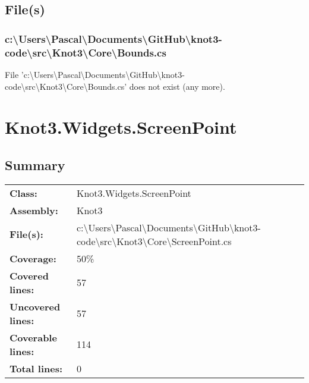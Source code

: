 \documentclass[a4paper,10pt]{article}
\begin{document}
\subsection{File(s)}
\subsubsection{c:\textbackslash Users\textbackslash Pascal\textbackslash Documents\textbackslash GitHub\textbackslash knot3-code\textbackslash src\textbackslash Knot3\textbackslash Core\textbackslash Bounds.cs}
 File 'c:\textbackslash Users\textbackslash Pascal\textbackslash Documents\textbackslash GitHub\textbackslash knot3-code\textbackslash src\textbackslash Knot3\textbackslash Core\textbackslash Bounds.cs' does not exist (any more).
\newpage
\section{Knot3.Widgets.ScreenPoint}
\subsection{Summary}
\begin{longtable}[l]{ll}
\textbf{Class:} & Knot3.Widgets.ScreenPoint\\
\textbf{Assembly:} & Knot3\\
\textbf{File(s):} & \begin{minipage}[t]{12cm}{c:\textbackslash Users\textbackslash Pascal\textbackslash Documents\textbackslash GitHub\textbackslash knot3-code\textbackslash src\textbackslash Knot3\textbackslash Core\textbackslash ScreenPoint.cs}\end{minipage} \\
\textbf{Coverage:} & 50\%\\
\textbf{Covered lines:} & 57\\
\textbf{Uncovered lines:} & 57\\
\textbf{Coverable lines:} & 114\\
\textbf{Total lines:} & 0\\
\end{longtable}
\end{document}
